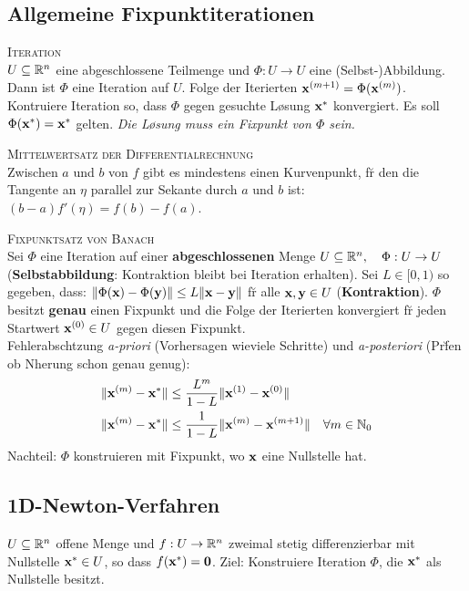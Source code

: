 \subsection{Allgemeine Fixpunktiterationen}
\textsc{Iteration}\\
$U \subseteq \mathbb{R}^{n}$ eine abgeschlossene Teilmenge und $\Phi: U \rightarrow U$ eine (Selbst-)Abbildung. Dann ist $\Phi$ eine Iteration auf $U$. Folge der Iterierten $\mbox{\bf x}^{(m+1)} = \Phi(\mbox{\bf x}^{(m)})$. Kontruiere Iteration so, dass $\Phi$ gegen gesuchte L\o sung $\mbox{\bf x}^*$ konvergiert. Es soll $\Phi(\mbox{\bf x}^*) = \mbox{\bf x}^*$ gelten. \emph{Die L\o sung muss ein Fixpunkt von $\Phi$ sein.}\vspace{0.2cm}

\textsc{Mittelwertsatz der Differentialrechnung}\\
Zwischen $a$ und $b$ von $f$ gibt es mindestens einen Kurvenpunkt, f\u r den die Tangente an $\eta$ parallel zur Sekante durch $a$ und $b$ ist:
$(b-a)f'(\eta) = f(b)-f(a)$. \vspace{0.2cm}

\textsc{Fixpunktsatz von Banach}\\
Sei $\Phi$ eine Iteration auf einer \textbf{abgeschlossenen} Menge $U \subseteq \mathbb{R}^{n}, \quad \Phi : U \rightarrow U$ (\textbf{Selbstabbildung}: Kontraktion bleibt bei Iteration erhalten). Sei $L \in [0,1)$ so gegeben, dass: $\Vert \Phi(\mbox{\bf x}) - \Phi(\mbox{\bf y}) \Vert \leq L \Vert \mbox{\bf x} - \mbox{\bf y} \Vert$ f\u r alle $\mbox{\bf x},\mbox{\bf y} \in U$ (\textbf{Kontraktion}). $\Phi$ besitzt \textbf{genau} einen Fixpunkt und die Folge der Iterierten konvergiert f\u r jeden Startwert $\mbox{\bf x}^{(0)} \in U$ gegen diesen Fixpunkt.\\
Fehlerabsch\a tzung \emph{a-priori} (Vorhersagen wieviele Schritte) und \emph{a-posteriori} (Pr\u fen ob N\a herung schon genau genug):
\begin{align*}
\Vert \mbox{\bf x}^{(m)} - \mbox{\bf x}^* \Vert &\leq \frac{L^m}{1-L} \Vert \mbox{\bf x}^{(1)} - \mbox{\bf x}^{(0)} \Vert \\
\Vert \mbox{\bf x}^{(m)} - \mbox{\bf x}^* \Vert &\leq \frac{1}{1-L} \Vert \mbox{\bf x}^{(m)} - \mbox{\bf x}^{(m+1)} \Vert \quad \forall m \in \mathbb{N}_0
\end{align*}
Nachteil: $\Phi$ konstruieren mit Fixpunkt, wo $\mbox{\bf x}$ eine Nullstelle hat.

\subsection{1D-Newton-Verfahren}
$U \subseteq \mathbb{R}^{n}$ offene Menge und $f: U \rightarrow \mathbb{R}^{n}$ zweimal stetig differenzierbar mit Nullstelle $\mbox{\bf x}^*\in U$, so dass $f(\mbox{\bf x}^*)=\mbox{\bf 0}$. Ziel: Konstruiere Iteration $\Phi$, die $\mbox{\bf x}^*$ als Nullstelle besitzt.\vspace{0.2cm}

